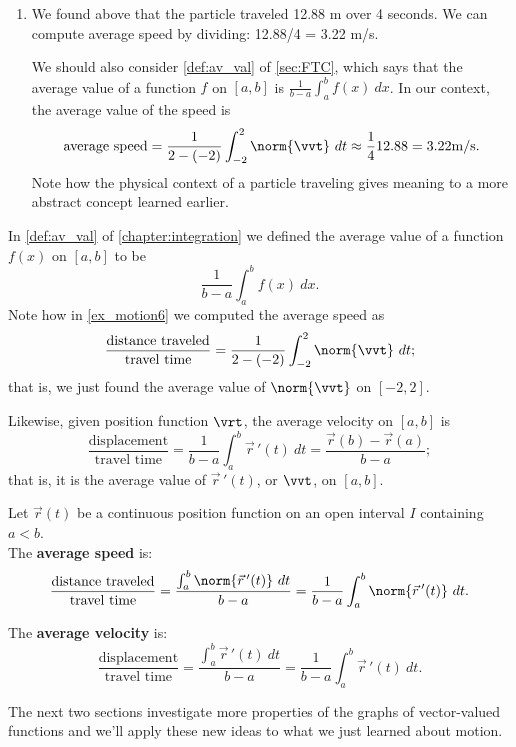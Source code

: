\begin{example}
\begin{enumerate}
	\item	We found above that the particle traveled 12.88 m over 4 seconds. We can compute average speed by dividing: 12.88/4 = 3.22 m/s. 
	
	We should also consider \autoref{def:av_val} of \autoref{sec:FTC}, which says that the average value of a function $f$ on $[a,b]$ is $\frac{1}{b-a}\int_a^b f(x)\ dx$. In our context, the average value of the speed is
	\[
	\text{average speed} = \frac{1}{2-(-2)}\int_{-2}^2 \norm{\vvt}\ dt \approx \frac14 12.88 = 3.22\text{m/s}.
	\]
	Note how the physical context of a particle traveling gives meaning to a more abstract concept learned earlier.
\end{enumerate}
\end{example}

In \autoref{def:av_val} of \autoref{chapter:integration} we defined the average value of a function $f(x)$ on $[a,b]$ to be
\[\frac{1}{b-a}\int_a^bf(x)\ dx.\]
Note how in \autoref{ex_motion6} we computed the average speed as
\[\frac{\text{distance traveled}}{\text{travel time}} = \frac1{2-(-2)}\int_{-2}^2\norm{\vvt}\ dt;\]
that is, we just found the average value of $\norm{\vvt}$ on $[-2,2]$.

Likewise, given position function $\vrt$, the average velocity on $[a,b]$ is
\[\frac{\text{displacement}}{\text{travel time}} = \frac1{b-a}\int_a^b \vec{r}\,'(t)\ dt = \frac{\vec r(b)-\vec r(a)}{b-a};\]
that is, it is the average value of $\vec r\,'(t)$, or $\vvt$, on $[a,b]$.\\

\begin{keyidea}\label{idea:average_speed_velocity}
Let $\vec r(t)$ be a continuous position function on an open interval $I$ containing $a<b$. \\

The \textbf{average speed} is:
\[\frac{\text{distance traveled}}{\text{travel time}} = \frac{\int_a^b \norm{\vec{r}\,'(t)}\ dt}{b-a} = \frac1{b-a}\int_a^b\norm{\vec{r}\,'(t)}\ dt.\]

The \textbf{average velocity} is:
\[\frac{\text{displacement}}{\text{travel time}} = \frac{\int_a^b \vec{r}\,'(t)\ dt}{b-a} = \frac1{b-a}\int_a^b\vec{r}\,'(t)\ dt.\]
\end{keyidea}

The next two sections investigate more properties of the graphs of vector-valued functions and we'll apply these new ideas to what we just learned about motion.

